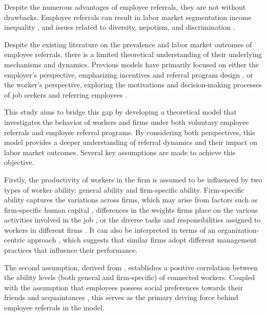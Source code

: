 \documentclass[12pt]{article}
\begin{document}
Despite the numerous advantages of employee referrals, they are not without drawbacks. Employee referrals can result in labor market segmentation \citep{kugler2003employee}income inequality \citep{calvo2004effects}, and issues related to diversity, nepotism, and discrimination \citep{pallais2016referential}.

Despite the existing literature on the prevalence and labor market outcomes of employee referrals, there is a limited theoretical understanding of their underlying mechanisms and dynamics. Previous models have primarily focused on either the employer's perspective, emphasizing incentives and referral program design \citep{ekinci2016employee}, or the worker's perspective, exploring the motivations and decision-making processes of job seekers and referring employees \citep{beaman2012gets, heath2018firms}.

This study aims to bridge this gap by developing a theoretical model that investigates the behavior of workers and firms under both voluntary employee referrals and employee referral programs. By considering both perspectives, this model provides a deeper understanding of referral dynamics and their impact on labor market outcomes. Several key assumptions are made to achieve this objective.

Firstly, the productivity of workers in the firm is assumed to be influenced by two types of worker ability: general ability and firm-specific ability. Firm-specific ability captures the variations across firms, which may arise from factors such as firm-specific human capital \citep{becker1962investment, becker1975investment}, differences in the weights firms place on the various activities involved in the job \citep{lazear2009firm}, or the diverse tasks and responsibilities assigned to workers in different firms \citep{gibbons2004task}. It can also be interpreted in terms of an organization-centric approach \citep{bloom2019drives, dessein2022organizational}, which suggests that similar firms adopt different management practices that influence their performance.

The second assumption, derived from \cite{montgomery1991social}, establishes a positive correlation between the ability levels (both general and firm-specific) of connected workers. Coupled with the assumption that employees possess social preferences towards their friends and acquaintances \citep{bandiera2009social, friebel2023employee}, this serves as the primary driving force behind employee referrals in the model.
\end{document}
